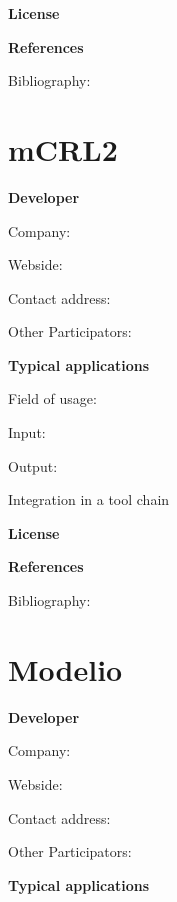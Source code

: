 \documentclass{./template/openetcs2}
\begin{document}
	\textbf{License}


	\textbf{References}

	Bibliography:


\section{mCRL2}

	\textbf{Developer}

	Company: 

	Webside:

	Contact address:

	Other  Participators:



	\textbf{Typical applications}

	Field of usage:


	Input:

	Output:





	Integration in a tool chain



	\textbf{License}


	\textbf{References}

	Bibliography:


\section{Modelio}

	\textbf{Developer}

	Company: 

	Webside:

	Contact address:

	Other  Participators:



	\textbf{Typical applications}
\end{document}

